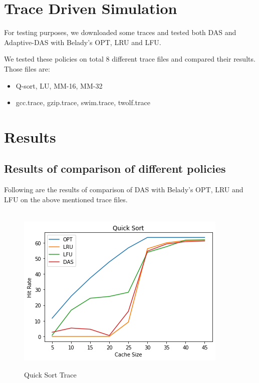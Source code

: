 \documentclass[conference]{IEEEtran}
\begin{document}
\section{Trace Driven Simulation}

For testing purposes, we downloaded some traces and tested both DAS and Adaptive-DAS with Belady's OPT, LRU and LFU.

We tested these policies on total 8 different trace files and compared their results. Those files are:

\begin{itemize}
    \item Q-sort, LU, MM-16, MM-32 \cite{r1}
    \item gcc.trace, gzip.trace, swim.trace, twolf.trace \cite{r2}
\end{itemize}

\section{Results}

\subsection{\textbf{Results of comparison of different policies}}
Following are the results of comparison of DAS with Belady's OPT, LRU and LFU on the above mentioned trace files.
\\
\\

\begin{figure}
        \centering
       \includegraphics[scale=0.6]{qsort.png}~
       \caption{Quick Sort Trace}\label{Fig:1}
 \end{figure}
\end{document}
